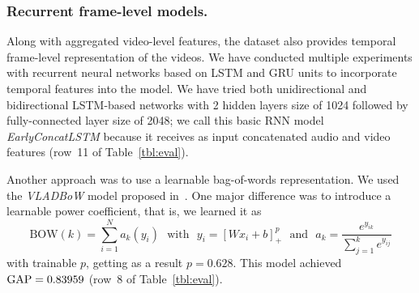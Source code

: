 \documentclass[runningheads]{llncs}
\begin{document}
\subsubsection*{Recurrent frame-level models.}
Along with aggregated video-level features, the dataset also provides temporal frame-level representation of the videos. 
We have conducted multiple experiments with recurrent neural networks based on LSTM and GRU units to incorporate temporal features into the model. We have tried both unidirectional and bidirectional LSTM-based networks with 2 hidden layers size of 1024 followed by fully-connected layer size of 2048; we call this basic RNN model \emph{EarlyConcatLSTM} because it receives as input concatenated audio and video features (row~11 of Table~\ref{tbl:eval}).

Another approach was to use a learnable bag-of-words representation. We used the \emph{VLADBoW} model proposed in~\cite{miech2017learnable}. One major difference was to introduce a learnable power coefficient, that is, we learned it as
$$
\text{BOW}(k) = \sum_{i=1}^{N}a_k(y_i)\text{~~with~~}
y_i=[Wx_i+b]_+^p\text{~~and~~}
a_k = \frac{e^{y_{ik}}}{\sum_{j=1}^{k}e^{y_{ij}}}
$$
with trainable $p$, getting as a result $p=0.628$. This model achieved $\mathrm{GAP}=0.83959$ (row~8 of Table~\ref{tbl:eval}).
\end{document}
